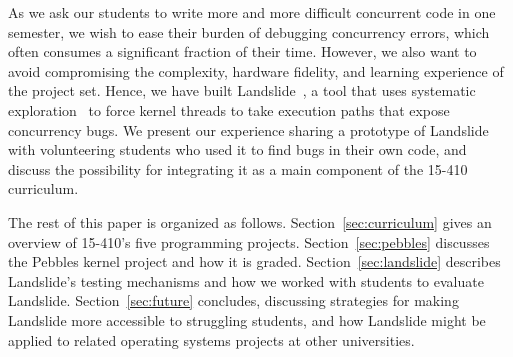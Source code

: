 As we ask our students to write more and more difficult concurrent code in one semester, we wish to ease their burden of debugging concurrency errors, which often consumes a significant fraction of their time.
However, we also want to avoid compromising the complexity, hardware fidelity, and learning experience of the project set.
Hence, we have built Landslide~\cite{landslide}, a tool that uses systematic exploration~\cite{verisoft} to force kernel threads to take execution paths that expose concurrency bugs.
We present our experience sharing a prototype of Landslide with volunteering students who used it to find bugs in their own code, and discuss the possibility for integrating it as a main component of the 15-410 curriculum.


The rest of this paper is organized as follows.
Section~\ref{sec:curriculum} gives an overview of 15-410's five programming projects.
Section~\ref{sec:pebbles} discusses the Pebbles kernel project and how it is graded.
Section~\ref{sec:landslide} describes Landslide's testing mechanisms and how we worked with students to evaluate Landslide.
Section~\ref{sec:future} concludes, discussing strategies for making Landslide more accessible to struggling students, and how Landslide might be applied to related operating systems projects at other universities.
